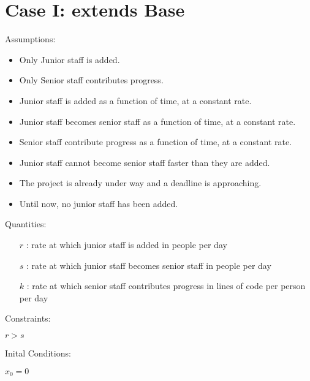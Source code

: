\documentclass{article}
\newenvironment{atomize}
    {\begin{list} {} {
            \setlength\itemindent{0pt}
            \setlength\leftmargin{10pt}
            \setlength\labelwidth{0pt}
    }}
    {\end{list}}
\begin{document}
\section*{Case I: extends Base}
    \begin{atomize}
        \item Assumptions:
            \begin{itemize}
                \item Only Junior staff is added.
                \item Only Senior staff contributes progress.
								\item Junior staff is added as a function of time, at a constant
								rate.
								\item Junior staff becomes senior staff as a function of time,
								at a constant rate.
								\item Senior staff contribute progress as a function of time, at
								a constant rate.
                \item Junior staff cannot become senior staff faster than they
								are added.
								\item The project is already under way and a deadline is
								approaching.
								\item Until now, no junior staff has been added.
            \end{itemize}

        \item Quantities:
            \begin{itemize}
                \item [$r$]: rate at which junior staff is added in people per
								day
                \item [$s$]: rate at which junior staff becomes senior staff in
								people per day
                \item [$k$]: rate at which senior staff contributes progress in
								lines of code per person per day
            \end{itemize}

				\item Constraints:
						\begin{atomize}
								\item $r > s$
						\end{atomize}

				\item Inital Conditions:
						\begin{atomize}
								\item $x_{0} = 0$
						\end{atomize}


\end{atomize}
\end{document}
